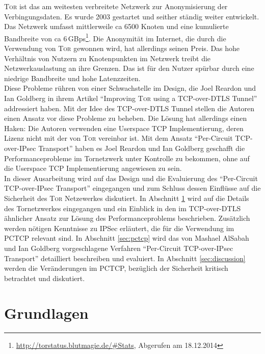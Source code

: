 \documentclass[fleqn,envcountsame,runningheads,10pt,a4paper]{llncs}
\begin{document}
\textsc{Tor} ist das am weitesten verbreitete Netzwerk zur Anonymisierung der Verbingungsdaten. Es wurde 2003 gestartet und seither ständig weiter entwickelt. Das Netzwerk umfasst mittlerweile ca 6500 Knoten und eine kumulierte Bandbreite von ca 6\,GBps\footnote{\url{http://torstatus.blutmagie.de/\#Stats}, Abgerufen am 18.12.2014}.  Die Anonymität im Internet, die durch die Verwendung von \textsc{Tor} gewonnen wird, hat allerdings seinen Preis. Das hohe Verhältnis von Nutzern zu Knotenpunkten im Netzwerk treibt die Netzwerkauslastung an ihre Grenzen. Das ist für den Nutzer spürbar durch eine niedrige Bandbreite und hohe Latenzzeiten. \\

Diese Probleme rühren von einer Schwachstelle im Design, die Joel Reardon und Ian Goldberg in ihrem Artikel ``Improving \textsc{Tor} using a TCP-over-DTLS Tunnel'' addressiert haben. Mit der Idee des TCP-over-DTLS Tunnel stellen die Autoren einen Ansatz vor diese Probleme zu beheben. Die Lösung hat allerdings einen Haken: Die Autoren verwenden eine Userspace TCP Implementierung, deren Lizenz nicht mit der von \textsc{Tor} vereinbar ist. Mit dem Ansatz ``Per-Circuit TCP-over-IPsec Transport'' haben es Joel Reardon und Ian Goldberg geschafft die Performanceprobleme im Tornetzwerk unter Kontrolle zu bekommen, ohne auf die Userspace TCP Implementierung angewiesen zu sein.\\

In dieser Ausarbeitung wird auf das Design und die Evaluierung des ``Per-Circuit TCP-over-IPsec Transport'' eingegangen und zum Schluss dessen Einflüsse auf die Sicherheit des \textsc{Tor} Netzewerkes diskutiert. In Abschnitt \ref{sec:basics} wird auf die Details des Tornetzwerkes eingegangen und ein Einblick in den im TCP-over-DTLS ähnlicher Ansatz zur Lösung des Performanceproblems beschrieben. Zusätzlich werden nötigen Kenntnisse zu IPSec erläutert, die für die Verwendung im PCTCP relevant sind. In Abschnitt \ref{sec:pctcp} wird das von Mashael AlSabah und Ian Goldberg vorgeschlagene Verfahren ``Per-Circuit TCP-over-IPsec Transport'' detailliert beschreiben und evaluiert. In Abschnitt \ref{sec:discussion} werden die Veränderungen im PCTCP, bezüglich der Sicherheit kritisch betrachtet und diskutiert.\\


\section{Grundlagen}
\label{sec:basics}
\end{document}

